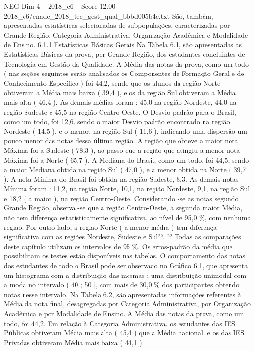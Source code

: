 \begin{textsample}{NEG Dim 4 – 2018\_c6 – Score 12.00 – 2018\_c6/enade\_2018\_tec\_gest\_qual\_bbbd005b4c.txt}
São, também, apresentadas estatísticas selecionadas de subpopulações, caracterizadas por Grande Região, Categoria Administrativa, Organização Acadêmica e Modalidade de Ensino. 6.1.1 Estatísticas Básicas Gerais Na Tabela 6.1, são apresentadas as Estatísticas Básicas da prova, por Grande Região, dos estudantes concluintes de Tecnologia em Gestão da Qualidade.
A Média das notas da prova, como um todo ( nas seções seguintes serão analisados os Componentes de Formação Geral e de Conhecimento Específico ) foi 44,2, sendo que os alunos da região Norte obtiveram a Média mais baixa ( 39,4 ), e os da região Sul obtiveram a Média mais alta ( 46,4 ).
As demais médias foram : 45,0 na região Nordeste, 44,0 na região Sudeste e 45,5 na região Centro-Oeste.
O Desvio padrão para o Brasil, como um todo, foi 12,6, sendo o maior Desvio padrão encontrado na região Nordeste ( 14,5 ), e o menor, na região Sul ( 11,6 ), indicando uma dispersão um pouco menor das notas dessa última região.
A região que obteve a maior nota Máxima foi a Sudeste ( 78,3 ), ao passo que a região que atingiu a menor nota Máxima foi a Norte ( 65,7 ).
A Mediana do Brasil, como um todo, foi 44,5, sendo a maior Mediana obtida na região Sul ( 47,0 ), e a menor obtida na Norte ( 39,7 ).
A nota Mínima do Brasil foi obtida na região Sudeste, 8,3.
As demais notas Mínima foram : 11,2, na região Norte, 10,1, na região Nordeste, 9,1, na região Sul e 18,2 ( a maior ), na região Centro-Oeste.
Considerando -se as notas segundo Grande Região, observa -se que a região Centro-Oeste, a segunda maior Média, não tem diferença estatisticamente significativa, ao nível de 95,0 \%, com nenhuma região.
Por outro lado, a região Norte ( a menor média ) tem diferença significativa com as regiões Nordeste, Sudeste e Sul²². ²² Todas as comparações deste capítulo utilizam os intervalos de 95 \%.
Os erros-padrão da média que possibilitam os testes estão disponíveis nas tabelas.
O comportamento das notas dos estudantes de todo o Brasil pode ser observado no Gráfico 6.1, que apresenta um histograma com a distribuição das mesmas : uma distribuição unimodal com a moda no intervalo ( 40 ; 50 ], com mais de 30,0 \% dos participantes obtendo notas nesse intervalo.
Na Tabela 6.2, são apresentadas informações referentes à Média da nota final, desagregadas por Categoria Administrativa, por Organização Acadêmica e por Modalidade de Ensino.
A Média das notas da prova, como um todo, foi 44,2.
Em relação à Categoria Administrativa, os estudantes das IES Públicas obtiveram Média mais alta ( 45,4 ) que a Média nacional, e os das IES Privadas obtiveram Média mais baixa ( 44,1 ).

\end{textsample}
